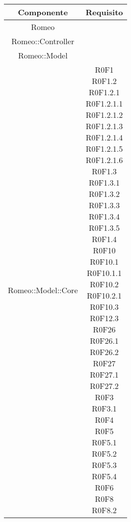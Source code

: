 \begin{center}
\begin{longtable}{|c|c|}
\hline

\textbf{Componente} & \textbf{Requisito} \\


\hline
\parbox[t]{\larghezza}{Romeo}   & \parbox[t]{\larghezza}{} \\
\hline
\parbox[t]{\larghezza}{Romeo::Controller}   & \parbox[t]{\larghezza}{} \\
\hline
\parbox[t]{\larghezza}{Romeo::Model}   & \parbox[t]{\larghezza}{} \\
\hline
\parbox[t]{\larghezza}{Romeo::Model::Core}   & \parbox[t]{\larghezza}{ R0F1 \\ R0F1.2 \\ R0F1.2.1 \\ R0F1.2.1.1 \\ R0F1.2.1.2 \\ R0F1.2.1.3 \\ R0F1.2.1.4 \\ R0F1.2.1.5 \\ R0F1.2.1.6 \\ R0F1.3 \\ R0F1.3.1 \\ R0F1.3.2 \\ R0F1.3.3 \\ R0F1.3.4 \\ R0F1.3.5 \\ R0F1.4 \\ R0F10 \\ R0F10.1 \\ R0F10.1.1 \\ R0F10.2 \\ R0F10.2.1 \\ R0F10.3 \\ R0F12.3 \\ R0F26 \\ R0F26.1 \\ R0F26.2 \\ R0F27 \\ R0F27.1 \\ R0F27.2 \\ R0F3 \\ R0F3.1 \\ R0F4 \\ R0F5 \\ R0F5.1 \\ R0F5.2 \\ R0F5.3 \\ R0F5.4 \\ R0F6 \\ R0F8 \\ R0F8.2  \\}\\


\end{longtable}
\end{center}
